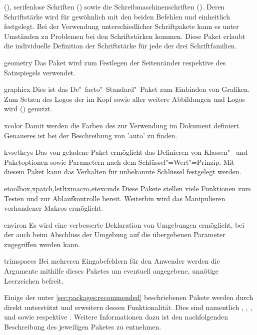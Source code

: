 \begin{packages}
  (), serifenlose Schriften () sowie die 
  Schreibmaschinenschriften (). Deren Schriftstärke wird für 
  gewöhnlich mit den beiden Befehlen  und  
  einheitlich festgelegt. Bei der Verwendung unterschiedlicher Schriftpakete 
  kann es unter Umständen zu Problemen bei den Schriftstärken kommen. Diese 
  Paket erlaubt die individuelle Definition der Schriftstärke für jede der drei 
  Schriftfamilien.
\item[geometry]
  Das Paket wird zum Festlegen der Seitenränder respektive des Satzspiegels 
  verwendet.
\item[graphicx]
  Dies ist das De"~facto"~Standard"~Paket zum Einbinden von Grafiken. Zum 
  Setzen des Logos der \TnUD im Kopf sowie aller weitere Abbildungen und Logos 
  wird () genutzt.
\item[xcolor]
  Damit werden die Farben des \CDs zur Verwendung im Dokument definiert. 
  Genaueres ist bei der Beschreibung von 'auto' zu finden. 
\item[kvsetkeys]
  Das von  geladene Paket  ermöglicht das 
  Definieren von Klassen"~ und Paketoptionen sowie Parametern nach dem 
  Schlüssel"=Wert"=Prinzip. Mit diesem Paket kann das Verhalten für unbekannte 
  Schlüssel festgelegt werden.
\item[etoolbox,xpatch,letltxmacro,etexcmds]
  Diese Pakete stellen viele Funktionen zum Testen und zur Ablaufkontrolle 
  bereit. Weiterhin wird das Manipulieren vorhandener Makros ermöglicht.
\item[environ]
  Es wird eine verbesserte Deklaration von Umgebungen ermöglicht, bei der auch 
  beim Abschluss der Umgebung auf die übergebenen Parameter zugegriffen werden 
  kann. 
\item[trimspaces]
  Bei mehreren Eingabefeldern für den Anwender werden die Argumente mithilfe 
  dieses Paketes um eventuell angegebene, unnötige Leerzeichen befreit.
\end{packages}



%
Einige der unter \autoref{sec:packages:recommended} beschriebenen Pakete werden 
durch \TUDScript direkt unterstützt und erweitern dessen Funktionalität. Dies
sind namentlich , , , 
 und  sowie  respektive 
. Weitere Informationen dazu ist den nachfolgenden 
Beschreibung des jeweiligen Paketes zu entnehmen.



